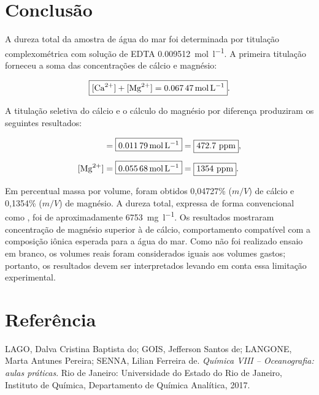 \documentclass[a4paper,12pt]{article}
\begin{document}
\section{Conclusão}

A dureza total da amostra de água do mar foi determinada por titulação
complexométrica com solução de EDTA
\qty{0.009512}{\mole\per\litre}. A primeira titulação forneceu a soma das
concentrações de cálcio e magnésio:

\begin{equation*}
\boxed{
[\ce{Ca^2+}]+[\ce{Mg^2+}]
=
\qty{0.06747}{\mole\per\litre}
}.
\end{equation*}

A titulação seletiva do cálcio e o cálculo do magnésio por diferença
produziram os seguintes resultados:

\begin{align*}
[\ce{Ca^2+}]
&=
\boxed{\qty{0.01179}{\mole\per\litre}}
=
\boxed{472.7\ \mathrm{ppm}},\\[0.2cm]
[\ce{Mg^2+}]
&=
\boxed{\qty{0.05568}{\mole\per\litre}}
=
\boxed{1354\ \mathrm{ppm}}.
\end{align*}

Em percentual massa por volume, foram obtidos 0,04727\% ($m/V$) de cálcio
e 0,1354\% ($m/V$) de magnésio. A dureza total, expressa de forma
convencional como , foi de aproximadamente
\qty{6753}{\milli\gram\per\litre}. Os resultados mostraram concentração de
magnésio superior à de cálcio, comportamento compatível com a composição
iônica esperada para a água do mar. Como não foi realizado ensaio em branco,
os volumes reais foram considerados iguais aos volumes gastos; portanto, os
resultados devem ser interpretados levando em conta essa limitação
experimental.

\section*{Referência}

LAGO, Dalva Cristina Baptista do; GOIS, Jefferson Santos de; LANGONE,
Marta Antunes Pereira; SENNA, Lilian Ferreira de.
\textit{Química VIII -- Oceanografia: aulas práticas}.
Rio de Janeiro: Universidade do Estado do Rio de Janeiro,
Instituto de Química, Departamento de Química Analítica, 2017.
\end{document}
